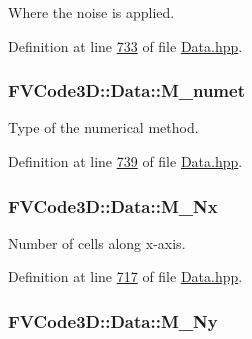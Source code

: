 Where the noise is applied. 



Definition at line \hyperlink{Data_8hpp_source_l00733}{733} of file \hyperlink{Data_8hpp_source}{Data.\+hpp}.

\subsubsection[{\texorpdfstring{M\+\_\+numet}{M_numet}}]{ F\+V\+Code3\+D\+::\+Data\+::\+M\+\_\+numet\hspace{0.3cm}{\ttfamily [protected]}}\hypertarget{classFVCode3D_1_1Data_acabd10057aa8ce14f50ee7fbd354ac64}{}\label{classFVCode3D_1_1Data_acabd10057aa8ce14f50ee7fbd354ac64}


Type of the numerical method. 



Definition at line \hyperlink{Data_8hpp_source_l00739}{739} of file \hyperlink{Data_8hpp_source}{Data.\+hpp}.

\subsubsection[{\texorpdfstring{M\+\_\+\+Nx}{M_Nx}}]{ F\+V\+Code3\+D\+::\+Data\+::\+M\+\_\+\+Nx\hspace{0.3cm}{\ttfamily [protected]}}\hypertarget{classFVCode3D_1_1Data_ae8b5472d8bc05b2b312380fe0bcfc8f9}{}\label{classFVCode3D_1_1Data_ae8b5472d8bc05b2b312380fe0bcfc8f9}


Number of cells along x-\/axis. 



Definition at line \hyperlink{Data_8hpp_source_l00717}{717} of file \hyperlink{Data_8hpp_source}{Data.\+hpp}.

\subsubsection[{\texorpdfstring{M\+\_\+\+Ny}{M_Ny}}]{ F\+V\+Code3\+D\+::\+Data\+::\+M\+\_\+\+Ny\hspace{0.3cm}{\ttfamily [protected]}}\hypertarget{classFVCode3D_1_1Data_a90a08fe8c4566c7afcdf62772ee4712b}{}\label{classFVCode3D_1_1Data_a90a08fe8c4566c7afcdf62772ee4712b}


